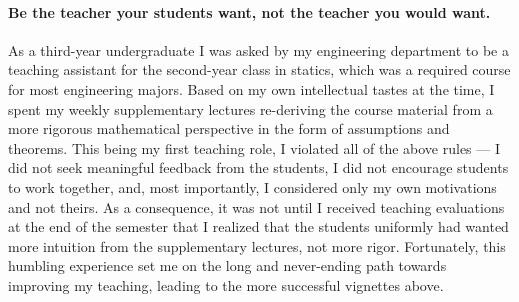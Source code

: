 \paragraph{Be the teacher your students want, not the teacher you would want.}

As a third-year undergraduate I was asked by my engineering department to be a
teaching assistant for the second-year class in statics, which was a required
course for most engineering majors.  Based on my own intellectual tastes at the
time, I spent my weekly supplementary lectures re-deriving the course material
from a more rigorous mathematical perspective in the form of assumptions and
theorems.  This being my first teaching role, I violated all of the above rules ---
I did not seek meaningful feedback from the students, I did not encourage
students to work together, and, most importantly, I considered only my own
motivations and not theirs.  As a consequence, it was not until I received
teaching evaluations at the end of the semester that I realized that the
students uniformly had wanted more intuition from the supplementary lectures,
not more rigor.  Fortunately, this humbling experience set me on the long  and
never-ending path towards improving my teaching, leading to the more successful
vignettes above.



